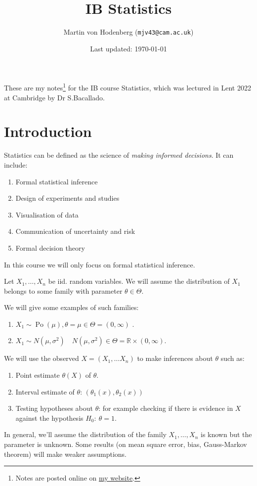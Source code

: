 \documentclass[egregdoesnotlikesansseriftitles,a4paper]{scrartcl}
\title{IB Statistics}
\author{Martin von Hodenberg (\texttt{mjv43@cam.ac.uk})}
\date{Last updated: \today}
\begin{document}
\maketitle
These are my notes\footnote{Notes are posted online on \href{https://mjv43.user.srcf.net/}{my website}.} for the IB course Statistics, which was lectured in Lent 2022 at Cambridge by Dr S.Bacallado.

\newpage
\tableofcontents
\newpage

\section{Introduction}
Statistics can be defined as the science of \emph{making informed decisions}. It can include:
\begin{enumerate}
    \item Formal statistical inference
    \item Design of experiments and studies
    \item Visualisation of data
    \item Communication of uncertainty and risk
    \item Formal decision theory
\end{enumerate}
In this course we will only focus on formal statistical inference.
\begin{definition*}
     Let $X_1 , \ldots , X_n$ be iid. random variables. We will assume the distribution of $X_1 $ belongs to some family with parameter $\theta \in \Theta$.
\end{definition*}
\begin{example*}
    We will give some examples of such families:
     \begin{enumerate}
         \item $X_1 \sim \operatorname{Po}(\mu), \theta=\mu \in \Theta=(0,\infty )$ .
         \item $X_1 \sim N (\mu, \sigma^2) \quad N (\mu, \sigma^2)\in \Theta=\mathbb{R} \times (0, \infty)$.
     \end{enumerate}
\end{example*}
We will use the observed $X= (X_1 , \ldots X_n)$ to make inferences about $\theta$ such as:
\begin{enumerate}
    \item Point estimate $\theta (X)$ of $\theta$.
    \item Interval estimate of $\theta$: $(\theta_1 (x),\theta_2 (x))$ 
    \item Testing hypotheses about $\theta$: for example checking if there is evidence in $X$ against the hypothesis $H_0 : \ \theta=1$.
\end{enumerate}
\begin{remark}
     In general, we'll assume the distribution of the family $X_1 , \ldots , X_n$ is known but the parameter is unknown. Some results (on mean square error, bias, Gauss-Markov theorem) will make weaker assumptions.
\end{remark}
\newpage
\end{document}
